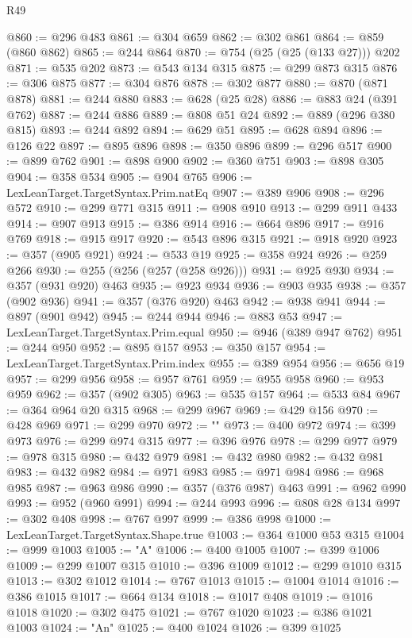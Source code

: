 \begin{lexlean}{R49}
\begin{coremodule}
@860 := @296 @483
@861 := @304 @659
@862 := @302 @861
@864 := @859 (@860 @862)
@865 := @244 @864
@870 := @754 (@25 (@25 (@133 @27))) @202
@871 := @535 @202
@873 := @543 @134 @315
@875 := @299 @873 @315
@876 := @306 @875
@877 := @304 @876
@878 := @302 @877
@880 := @870 (@871 @878)
@881 := @244 @880
@883 := @628 (@25 @28)
@886 := @883 @24 (@391 @762)
@887 := @244 @886
@889 := @808 @51 @24
@892 := @889 (@296 @380 @815)
@893 := @244 @892
@894 := @629 @51
@895 := @628 @894
@896 := @126 @22
@897 := @895 @896
@898 := @350 @896
@899 := @296 @517
@900 := @899 @762
@901 := @898 @900
@902 := @360 @751
@903 := @898 @305
@904 := @358 @534
@905 := @904 @765
@906 := LexLeanTarget.TargetSyntax.Prim.natEq
@907 := @389 @906
@908 := @296 @572
@910 := @299 @771 @315
@911 := @908 @910
@913 := @299 @911 @433
@914 := @907 @913
@915 := @386 @914
@916 := @664 @896
@917 := @916 @769
@918 := @915 @917
@920 := @543 @896 @315
@921 := @918 @920
@923 := @357 (@905 @921)
@924 := @533 @19
@925 := @358 @924
@926 := @259 @266
@930 := @255 (@256 (@257 (@258 @926)))
@931 := @925 @930
@934 := @357 (@931 @920) @463
@935 := @923 @934
@936 := @903 @935
@938 := @357 (@902 @936)
@941 := @357 (@376 @920) @463
@942 := @938 @941
@944 := @897 (@901 @942)
@945 := @244 @944
@946 := @883 @53
@947 := LexLeanTarget.TargetSyntax.Prim.equal
@950 := @946 (@389 @947 @762)
@951 := @244 @950
@952 := @895 @157
@953 := @350 @157
@954 := LexLeanTarget.TargetSyntax.Prim.index
@955 := @389 @954
@956 := @656 @19
@957 := @299 @956
@958 := @957 @761
@959 := @955 @958
@960 := @953 @959
@962 := @357 (@902 @305)
@963 := @535 @157
@964 := @533 @84
@967 := @364 @964 @20 @315
@968 := @299 @967
@969 := @429 @156
@970 := @428 @969
@971 := @299 @970
@972 := ""
@973 := @400 @972
@974 := @399 @973
@976 := @299 @974 @315
@977 := @396 @976
@978 := @299 @977
@979 := @978 @315
@980 := @432 @979
@981 := @432 @980
@982 := @432 @981
@983 := @432 @982
@984 := @971 @983
@985 := @971 @984
@986 := @968 @985
@987 := @963 @986
@990 := @357 (@376 @987) @463
@991 := @962 @990
@993 := @952 (@960 @991)
@994 := @244 @993
@996 := @808 @28 @134
@997 := @302 @408
@998 := @767 @997
@999 := @386 @998
@1000 := LexLeanTarget.TargetSyntax.Shape.true
@1003 := @364 @1000 @53 @315
@1004 := @999 @1003
@1005 := "A"
@1006 := @400 @1005
@1007 := @399 @1006
@1009 := @299 @1007 @315
@1010 := @396 @1009
@1012 := @299 @1010 @315
@1013 := @302 @1012
@1014 := @767 @1013
@1015 := @1004 @1014
@1016 := @386 @1015
@1017 := @664 @134
@1018 := @1017 @408
@1019 := @1016 @1018
@1020 := @302 @475
@1021 := @767 @1020
@1023 := @386 @1021 @1003
@1024 := "An"
@1025 := @400 @1024
@1026 := @399 @1025

\end{coremodule}
\end{lexlean}

